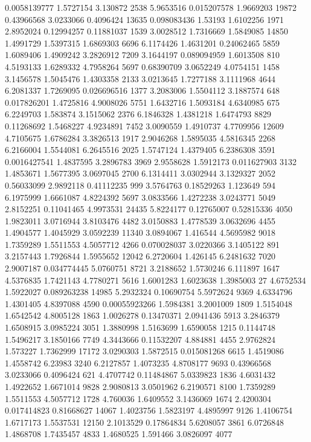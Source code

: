 0.0058139777 1.5727154 3.130872 2538
5.9653516 0.015207578 1.9669203 19872
0.43966568 3.0233066 0.4096424 13635
0.098083436 1.53193 1.6102256 1971
2.8952024 0.12994257 0.11881037 1539
3.0028512 1.7316669 1.5849085 14850
1.4991729 1.5397315 1.6869303 6696
6.1174426 1.4631201 0.24062465 5859
1.6089406 1.4909242 3.2826912 7209
3.1644197 0.089094959 1.6013508 810
4.5193133 1.6289332 4.7958264 5697
0.68390709 3.0652249 4.0754151 1458
3.1456578 1.5045476 1.4303358 2133
3.0213645 1.7277188 3.1111968 4644
6.2081337 1.7269095 0.026696516 1377
3.2083006 1.5504112 3.1887574 648
0.017826201 1.4725816 4.9008026 5751
1.6432716 1.5093184 4.6340985 675
6.2249703 1.583874 3.1515062 2376
6.1846328 1.4381218 1.6474793 8829
0.11268692 1.5468227 4.9234891 7452
3.0090559 1.4910737 4.7709956 12609
4.7105675 1.6786284 3.3826513 1917
2.9046268 1.5895035 4.5816345 2268
6.2166004 1.5544081 6.2645516 2025
1.5747124 1.4379405 6.2386308 3591
0.0016427541 1.4837595 3.2896783 3969
2.9558628 1.5912173 0.011627903 3132
1.4853671 1.5677395 3.0697045 2700
6.1314411 3.0302944 3.1329327 2052
0.56033099 2.9892118 0.41112235 999
3.5764763 0.18529263 1.123649 594
6.1975999 1.6661087 4.8224392 5697
3.0833566 1.4272238 3.0243771 5049
2.8152251 0.11041465 4.9973531 24435
5.8224177 0.12765007 0.52815336 4050
1.9823011 3.0716944 3.8103476 4482
3.0150883 1.4778539 3.0632696 4455
1.4904577 1.4045929 3.0592239 11340
3.0894067 1.416544 4.5695982 9018
1.7359289 1.5511553 4.5057712 4266
0.070028037 3.0220366 3.1405122 891
3.2157443 1.7926844 1.5955652 12042
6.2720604 1.426145 6.2481632 7020
2.9007187 0.034774445 5.0760751 8721
3.2188652 1.5730246 6.111897 1647
4.5376835 1.7421143 4.7780271 5616
1.6001283 1.6023638 1.3985003 27
4.6752534 1.5922027 0.089263238 14985
5.2932324 0.10690754 5.5972624 9369
4.6334796 1.4301405 4.8397088 4590
0.00055923266 1.5984381 3.2001009 1809
1.5154048 1.6542542 4.8005128 1863
1.0026278 0.13470371 2.0941436 5913
3.2846379 1.6508915 3.0985224 3051
1.3880998 1.5163699 1.6590058 1215
0.1144748 1.5496217 3.1850166 7749
4.3443666 0.11532207 4.884881 4455
2.9762824 1.573227 1.7362999 17172
3.0290303 1.5872515 0.015081268 6615
1.4519086 1.4558742 6.23983 3240
6.2127857 1.4073235 4.8708177 9693
0.43966568 3.0233066 0.4096424 621
4.4707742 0.11484867 5.0339823 1836
4.6031432 1.4922652 1.6671014 9828
2.9080813 3.0501962 6.2190571 8100
1.7359289 1.5511553 4.5057712 1728
4.760036 1.6409552 3.1436069 1674
2.4200304 0.017414823 0.81668627 14067
1.4023756 1.5823197 4.4895997 9126
1.4106754 1.6717173 1.5537531 12150
2.1013529 0.17864834 5.6208057 3861
6.0726848 1.4868708 1.7435457 4833
1.4680525 1.591466 3.0826097 4077
